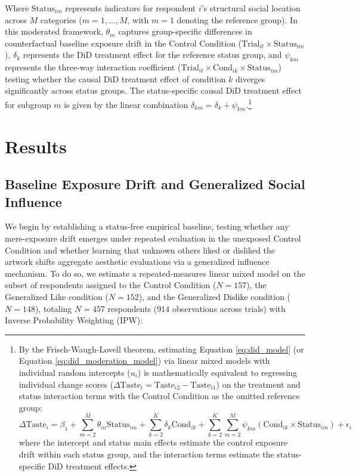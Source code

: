 \documentclass[12pt, letterpaper]{article}
\begin{document}
Where $\text{Status}_{im}$ represents indicators for respondent $i$'s structural social location across $M$ categories ($m = 1, \dots, M$, with $m = 1$ denoting the reference group). In this moderated framework, $\theta_m$ captures group-specific differences in counterfactual baseline exposure drift in the Control Condition ($\text{Trial}_{it} \times \text{Status}_{im}$), $\delta_k$ represents the DiD treatment effect for the reference status group, and $\psi_{km}$ represents the three-way interaction coefficient ($\text{Trial}_{it} \times \text{Cond}_{ik} \times \text{Status}_{im}$) testing whether the causal DiD treatment effect of condition $k$ diverges significantly across status groups. The status-specific causal DiD treatment effect for subgroup $m$ is given by the linear combination $\delta_{km} = \delta_k + \psi_{km}$.\footnote{By the Frisch-Waugh-Lovell theorem, estimating Equation \ref{eq:did_model} (or Equation \ref{eq:did_moderation_model}) via linear mixed models with individual random intercepts ($u_i$) is mathematically equivalent to regressing individual change scores ($\Delta \text{Taste}_i = \text{Taste}_{i2} - \text{Taste}_{i1}$) on the treatment and status interaction terms with the Control Condition as the omitted reference group:
\begin{equation}
\Delta \text{Taste}_i = \beta_{1} + \sum_{m=2}^{M} \theta_m \text{Status}_{im} + \sum_{k=2}^{K} \delta_k \text{Cond}_{ik} + \sum_{k=2}^{K} \sum_{m=2}^{M} \psi_{km} (\text{Cond}_{ik} \times \text{Status}_{im}) + \epsilon_i
\end{equation}
where the intercept and status main effects estimate the control exposure drift within each status group, and the interaction terms estimate the status-specific DiD treatment effects.} 

\section{Results}

\subsection{Baseline Exposure Drift and Generalized Social Influence}
We begin by establishing a status-free empirical baseline, testing whether any mere-exposure drift emerges under repeated evaluation in the unexposed Control Condition and whether learning that unknown others liked or disliked the artwork shifts aggregate aesthetic evaluations via a generalized influence mechanism. To do so, we estimate a repeated-measures linear mixed model on the subset of respondents assigned to the Control Condition ($N = 157$), the Generalized Like condition ($N = 152$), and the Generalized Dislike condition ($N = 148$), totaling $N = 457$ respondents ($914$ observations across trials) with Inverse Probability Weighting (IPW):
\end{document}
